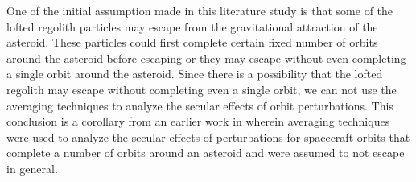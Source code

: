 One of the initial assumption made in this literature study is that some of the lofted regolith particles may escape from the gravitational attraction of the asteroid. These particles could first complete certain fixed number of orbits around the asteroid before escaping or they may escape without even completing a single orbit around the asteroid. Since there is a possibility that the lofted regolith may escape without completing even a single orbit, we can not use the averaging techniques to analyze the secular effects of orbit perturbations. This conclusion is a corollary from an earlier work in \cite{scheeres2012orbit} wherein averaging techniques were used to analyze the secular effects of perturbations for spacecraft orbits that complete a number of orbits around an asteroid and were assumed to not escape in general.


